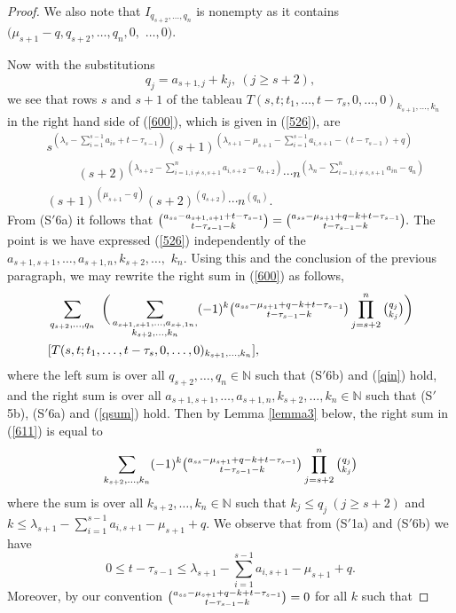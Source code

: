 \documentclass[ALCO,Unicode]{cedram}
\numberwithin{equation}{section}
\begin{document}
\begin{proof}
	We also note that $I_{q_{s+2},\dots,q_n}$ is nonempty as it contains $(\mu_{s+1}-q,q_{s+2}, \dots, q_n, 0,$ $ \dots,0)$.
	
		Now with the substitutions \[q_j=a_{s+1,j}+k_j, \  (j \ge s+2),\] we see that rows $s$ and $s+1$ of the tableau $T(s,t;t_1,\dots,t-\tau_s,0,\dots,0)_{k_{s+1},\dots,k_n}$ in the right hand side of (\ref{600}), which is given in (\ref{526}), are
	\begin{align}\label{ss+1}
		&s^{(\lambda_s -\sum_{i=1}^{s-1}a_{is}+t-\tau_{s-1})}        (s+1)^{(\lambda_{s+1}-\mu_{s+1}-\sum_{i=1}^{s-1}a_{i,s+1}-(t-\tau_{s-1})+q)}  \\ \nonumber    
		&\;\;\;\;\;\;\;\;\;(s+2)^{(\lambda_{s+2}-\sum_{i=1, i \neq s,s+1}^{n}a_{i,s+2}-q_{s+2})}\cdots n^{(\lambda_{n}-\sum_{i=1, i \neq s,s+1}^{n}a_{in}-q_{n})} \\ \nonumber
		&(s+1)^{(\mu_{s+1}-q)}   (s+2)^{(q_{s+2})}\cdots  n^{(q_{n})}.
	\end{align} From (S$'$6a) it follows that $\tbinom{a_{ss}-a_{s+1,s+1}+t-\tau_{s-1}}{t-\tau_{s-1}-k}=\tbinom{a_{ss}-\mu_{s+1}+q-k+t-\tau_{s-1}}{t-\tau_{s-1}-k}.$ The point is we have expressed (\ref{526}) independently of the $a_{s+1,s+1},\dots,a_{s+1,n},k_{s+2},\dots,$ $k_n$. Using this and the conclusion of the previous paragraph,  we may rewrite the right sum in (\ref{600}) as follows, 
		\begin{align}\label{611}
		& \sum_{q_{s+2},\dots,q_n} \  \bigg(\sum_{\substack {a_{s+1,s+1},\dots,a_{s+,1n}, \\ k_{s+2},\dots,k_n }  }  (-1)^k \tbinom{a_{ss}-\mu_{s+1}+q-k+t-\tau_{s-1}}{t-\tau_{s-1}-k}\prod_{j=s+2}^{n}\tbinom{q_{j}}{k_{j}}\bigg) \\\nonumber& [T(s,t;t_1,\dots,t-\tau_s,0,\dots,0)_{k_{s+1},\dots,k_n}], \end{align}
	where the left sum is over all $q_{s+2},\dots,q_n \in \mathbb{N}$ such that (S$'$6b) and (\ref{qin}) hold, and the right sum is over all $a_{s+1,s+1},\dots,a_{s+1,n},k_{s+2},\dots,k_n \in \mathbb{N}$ such that (S$'$5b), (S$'$6a) and (\ref{qsum}) hold. Then by Lemma \ref{lemma3} below, the right sum in (\ref{611}) is equal to 
	\begin{equation}\label{sum1}\sum_{ k_{s+2},\dots,k_n }  (-1)^k \tbinom{a_{ss}-\mu_{s+1}+q-k+t-\tau_{s-1}}{t-\tau_{s-1}-k}\prod_{j=s+2}^{n}\tbinom{q_{j}}{k_{j}}\end{equation}
where the sum is over all $k_{s+2},\dots,k_n \in \mathbb{N}$ such that 
$k_j \le q_j  \  (j\ge s+2)$ and $k \le \lambda_{s+1}-\sum_{i=1}^{s-1}a_{i,s+1}-\mu_{s+1}+q.$ We observe that from (S$'$1a) and (S$'$6b) we have \[ 0 \le t-\tau_{s-1} \le \lambda_{s+1}-\sum_{i=1}^{s-1}a_{i,s+1}-\mu_{s+1} + q.\] Moreover, by our convention $\tbinom{a_{ss}-\mu_{s+1}+q-k+t-\tau_{s-1}}{t-\tau_{s-1}-k}=0$ for all $k$ such that 

\end{proof}
\end{document}
